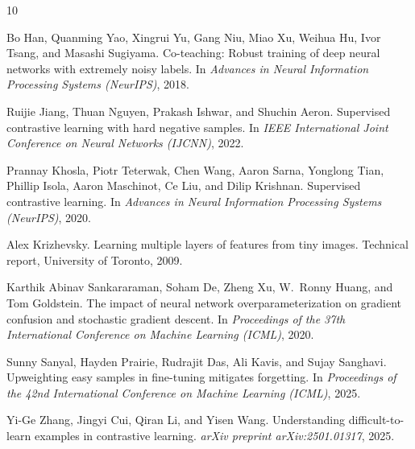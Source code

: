 \documentclass{article}
\begin{document}

\begin{thebibliography}{10}

Bo Han, Quanming Yao, Xingrui Yu, Gang Niu, Miao Xu, Weihua Hu, Ivor Tsang, and Masashi Sugiyama.
\newblock Co-teaching: Robust training of deep neural networks with extremely noisy labels.
\newblock In \emph{Advances in Neural Information Processing Systems (NeurIPS)}, 2018.

Ruijie Jiang, Thuan Nguyen, Prakash Ishwar, and Shuchin Aeron.
\newblock Supervised contrastive learning with hard negative samples.
\newblock In \emph{IEEE International Joint Conference on Neural Networks (IJCNN)}, 2022.

Prannay Khosla, Piotr Teterwak, Chen Wang, Aaron Sarna, Yonglong Tian, Phillip Isola, Aaron Maschinot, Ce Liu, and Dilip Krishnan.
\newblock Supervised contrastive learning.
\newblock In \emph{Advances in Neural Information Processing Systems (NeurIPS)}, 2020.

Alex Krizhevsky.
\newblock Learning multiple layers of features from tiny images.
\newblock Technical report, University of Toronto, 2009.

Karthik Abinav Sankararaman, Soham De, Zheng Xu, W.~Ronny Huang, and Tom Goldstein.
\newblock The impact of neural network overparameterization on gradient confusion and stochastic gradient descent.
\newblock In \emph{Proceedings of the 37th International Conference on Machine Learning (ICML)}, 2020.

Sunny Sanyal, Hayden Prairie, Rudrajit Das, Ali Kavis, and Sujay Sanghavi.
\newblock Upweighting easy samples in fine-tuning mitigates forgetting.
\newblock In \emph{Proceedings of the 42nd International Conference on Machine Learning (ICML)}, 2025.

Yi-Ge Zhang, Jingyi Cui, Qiran Li, and Yisen Wang.
\newblock Understanding difficult-to-learn examples in contrastive learning.
\newblock \emph{arXiv preprint arXiv:2501.01317}, 2025.

\end{thebibliography}
\end{document}
